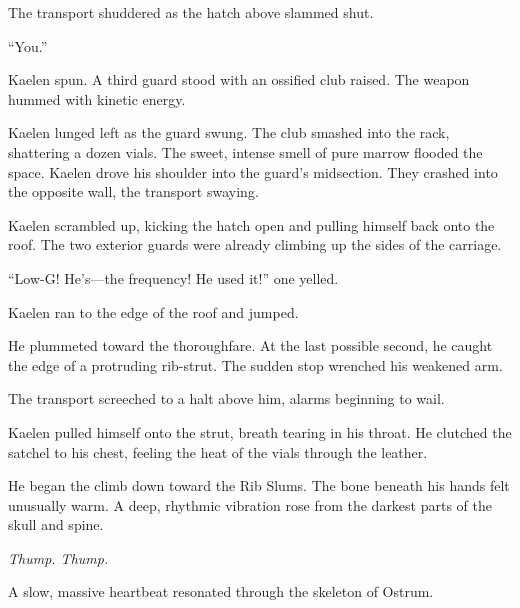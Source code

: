 The transport shuddered as the hatch above slammed shut.

``You.''

Kaelen spun. A third guard stood with an ossified club raised. The weapon hummed with kinetic energy.

Kaelen lunged left as the guard swung. The club smashed into the rack, shattering a dozen vials. The sweet, intense smell of pure marrow flooded the space. Kaelen drove his shoulder into the guard's midsection. They crashed into the opposite wall, the transport swaying.

Kaelen scrambled up, kicking the hatch open and pulling himself back onto the roof. The two exterior guards were already climbing up the sides of the carriage.

``Low-G! He's---the frequency! He used it!'' one yelled.

Kaelen ran to the edge of the roof and jumped.

He plummeted toward the thoroughfare. At the last possible second, he caught the edge of a protruding rib-strut. The sudden stop wrenched his weakened arm.

The transport screeched to a halt above him, alarms beginning to wail.

Kaelen pulled himself onto the strut, breath tearing in his throat. He clutched the satchel to his chest, feeling the heat of the vials through the leather.

He began the climb down toward the Rib Slums. The bone beneath his hands felt unusually warm. A deep, rhythmic vibration rose from the darkest parts of the skull and spine.

\textit{Thump. Thump.}

A slow, massive heartbeat resonated through the skeleton of Ostrum.
